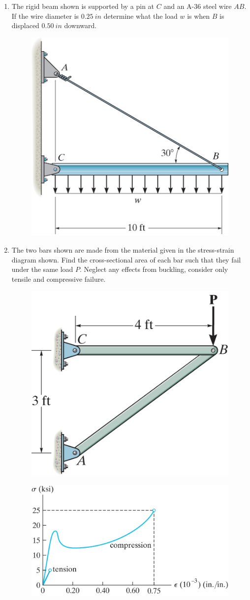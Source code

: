 \documentclass[12pt, oneside]{article}
\let\US\SI
\begin{document}
\begin{enumerate}
	\item %
		The rigid beam shown is supported by a pin at $C$ and an A-36 steel wire $AB$.
		If the wire diameter is $\US{0.25}{in}$ determine what the load $w$ is when $B$ is displaced $\US{0.50}{in}$ downward.
		\begin{figure}[H]
			\centering
			\includegraphics[width=0.5\linewidth]{elastic1}
			\label{fig:elastic1}
		\end{figure}
		\newpage

	\item %
		The two bars shown are made from the material given in the stress-strain diagram shown.
		Find the cross-sectional area of each bar such that they fail under the same load $P$. 
		Neglect any effects from buckling, consider only tensile and compressive failure.
		\begin{figure}[H]
			\centering
			\includegraphics[width=0.4\linewidth]{plastic1}
			\label{fig:plastic1}
		\end{figure}
		\begin{figure}[H]
			\centering
			\includegraphics[width=0.7\linewidth]{plastic2}
			\label{fig:plastic2}
		\end{figure}


\end{enumerate}
\end{document}
